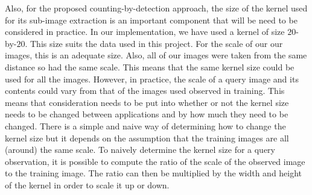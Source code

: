 Also, for the proposed counting-by-detection approach, the size of the kernel used for its sub-image extraction is an important component that will be need to be considered in practice. In our implementation, we have used a kernel of size $20$-by-$20$. This size suits the data used in this project. For the scale of our our images, this is an adequate size. Also, all of our images were taken from the same distance so had the same scale. This means that the same kernel size could be used for all the images. However, in practice, the scale of a query image and its contents could vary from that of the images used observed in training. This means that consideration needs to be put into whether or not the kernel size needs to be changed between applications and by how much they need to be changed. There is a simple and naive way of determining how to change the kernel size but it depends on the assumption that the training images are all (around) the same scale. To naively determine the kernel size for a query observation, it is possible to compute the ratio of the scale of the observed image to the training image. The ratio can then be multiplied by the width and height of the kernel in order to scale it up or down.

